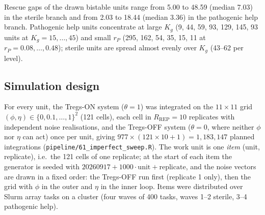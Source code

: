 \documentclass[11pt]{article}
\begin{document}
Rescue gaps of the drawn bistable units range from 5.00 to 48.59 (median 7.03)
in the sterile branch and from 2.03 to 18.44 (median 3.36) in the pathogenic help
branch. Pathogenic help units concentrate at large $K_g$ (9, 44, 59, 93, 129,
145, 93 units at $K_g = 15, \dots, 45$) and small $r_P$ (295, 162, 54, 35, 15,
11 at $r_P = 0.08, \dots, 0.48$); sterile units are spread almost evenly over
$K_g$ (43--62 per level).

\subsection{Simulation design}

For every unit, the Tregs-ON system ($\theta = 1$) was integrated
on the $11 \times 11$ grid $(\phi, \eta) \in \{0, 0.1, \dots, 1\}^2$ (121 cells),
each cell in $R_{\mathrm{REP}} = 10$ replicates with independent noise
realisations, and the Tregs-OFF system ($\theta = 0$, where
neither $\phi$ nor $\eta$ can act) once per unit, giving
$977 \times (121 \times 10 + 1) = 1{,}183{,}147$ planned integrations
(\texttt{pipeline/61\_imperfect\_sweep.R}). The work unit is one
\emph{item} (unit, replicate), i.e.\ the 121 cells of one replicate; at the
start of each item the generator is seeded with
$20260917 + 1000\cdot\mathrm{unit} + \mathrm{replicate}$, and the noise vectors
are drawn in a fixed order: the Tregs-OFF run first (replicate 1 only), then
the grid with $\phi$ in the outer and $\eta$ in the inner loop. Items were
distributed over Slurm array tasks on a cluster (four waves of 400 tasks,
waves 1--2 sterile, 3--4 pathogenic help).
\end{document}
